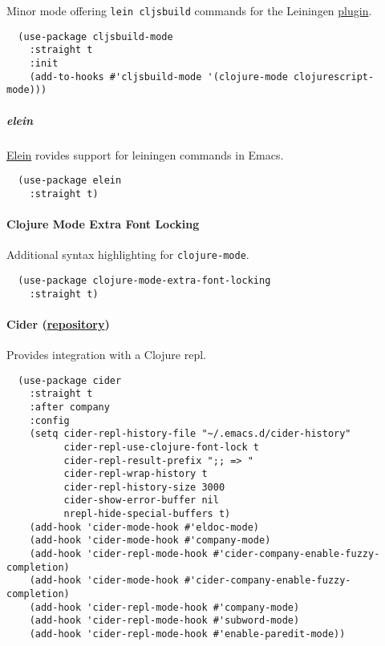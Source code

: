 \documentclass[11pt]{article}
\begin{document}
Minor mode offering \texttt{lein cljsbuild} commands for the Leiningen \href{https://github.com/emezeske/lein-cljsbuild}{plugin}.

\begin{verbatim}
  (use-package cljsbuild-mode
    :straight t
    :init
    (add-to-hooks #'cljsbuild-mode '(clojure-mode clojurescript-mode)))
\end{verbatim}

\subparagraph*{elein}
\label{sec:orgb761253}

\href{https://github.com/remvee/elein}{Elein} rovides support for leiningen commands in Emacs.

\begin{verbatim}
  (use-package elein
    :straight t)
\end{verbatim}

\paragraph*{Clojure Mode Extra Font Locking}
\label{sec:org7adf88e}

Additional syntax highlighting for \texttt{clojure-mode}.


\begin{verbatim}
  (use-package clojure-mode-extra-font-locking
    :straight t)
\end{verbatim}

\paragraph*{Cider (\href{https://github.com/clojure-emacs/cider}{repository})}
\label{sec:orgdb6caa7}

Provides integration with a Clojure repl.

\begin{verbatim}
  (use-package cider
    :straight t
    :after company
    :config
    (setq cider-repl-history-file "~/.emacs.d/cider-history"
          cider-repl-use-clojure-font-lock t
          cider-repl-result-prefix ";; => "
          cider-repl-wrap-history t
          cider-repl-history-size 3000
          cider-show-error-buffer nil
          nrepl-hide-special-buffers t)
    (add-hook 'cider-mode-hook #'eldoc-mode)
    (add-hook 'cider-mode-hook #'company-mode)
    (add-hook 'cider-repl-mode-hook #'cider-company-enable-fuzzy-completion)
    (add-hook 'cider-mode-hook #'cider-company-enable-fuzzy-completion)
    (add-hook 'cider-repl-mode-hook #'company-mode)
    (add-hook 'cider-repl-mode-hook #'subword-mode)
    (add-hook 'cider-repl-mode-hook #'enable-paredit-mode))
\end{verbatim}
\end{document}
